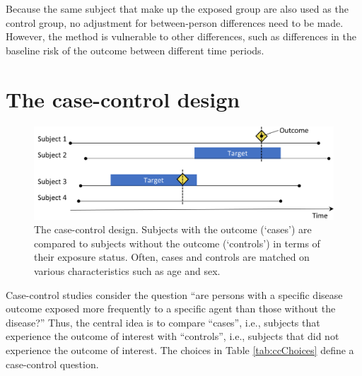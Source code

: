 \documentclass[11pt]{book}
\begin{document}
Because the same subject that make up the exposed group are also used as
the control group, no adjustment for between-person differences need to
be made. However, the method is vulnerable to other differences, such as
differences in the baseline risk of the outcome between different time
periods.

\section{The case-control design}\label{the-case-control-design}

\begin{figure}

{\centering \includegraphics[width=0.9\linewidth]{images/PopulationLevelEstimation/caseControl} 

}

\caption{The case-control design. Subjects with the outcome (‘cases’) are compared to subjects without the outcome (‘controls’) in terms of their exposure status. Often, cases and controls are matched on various characteristics such as age and sex.}\label{fig:caseControl}
\end{figure}

Case-control studies \citep{vandenbroucke_2012} consider the question
``are persons with a specific disease outcome exposed more frequently to
a specific agent than those without the disease?'' Thus, the central
idea is to compare ``cases'', i.e., subjects that experience the outcome
of interest with ``controls'', i.e., subjects that did not experience
the outcome of interest. The choices in Table \ref{tab:ccChoices} define
a case-control question.
\end{document}
